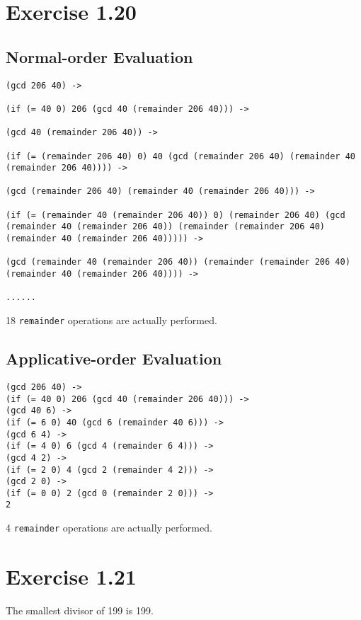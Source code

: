 \documentclass[../main.tex]{subfiles}
\begin{document}
\section{Exercise 1.20}

\subsection*{Normal-order Evaluation}

\begin{lstlisting}
(gcd 206 40) ->

(if (= 40 0) 206 (gcd 40 (remainder 206 40))) ->

(gcd 40 (remainder 206 40)) ->

(if (= (remainder 206 40) 0) 40 (gcd (remainder 206 40) (remainder 40 (remainder 206 40)))) ->

(gcd (remainder 206 40) (remainder 40 (remainder 206 40))) ->

(if (= (remainder 40 (remainder 206 40)) 0) (remainder 206 40) (gcd (remainder 40 (remainder 206 40)) (remainder (remainder 206 40) (remainder 40 (remainder 206 40))))) ->

(gcd (remainder 40 (remainder 206 40)) (remainder (remainder 206 40) (remainder 40 (remainder 206 40)))) ->

......
\end{lstlisting}

18 \lstinline{remainder} operations are actually performed.

\subsection*{Applicative-order Evaluation}

\begin{lstlisting}
(gcd 206 40) ->
(if (= 40 0) 206 (gcd 40 (remainder 206 40))) ->
(gcd 40 6) ->
(if (= 6 0) 40 (gcd 6 (remainder 40 6))) ->
(gcd 6 4) ->
(if (= 4 0) 6 (gcd 4 (remainder 6 4))) ->
(gcd 4 2) ->
(if (= 2 0) 4 (gcd 2 (remainder 4 2))) ->
(gcd 2 0) ->
(if (= 0 0) 2 (gcd 0 (remainder 2 0))) ->
2
\end{lstlisting}

4 \lstinline{remainder} operations are actually performed.

\section{Exercise 1.21}

The smallest divisor of 199 is 199.
\end{document}
